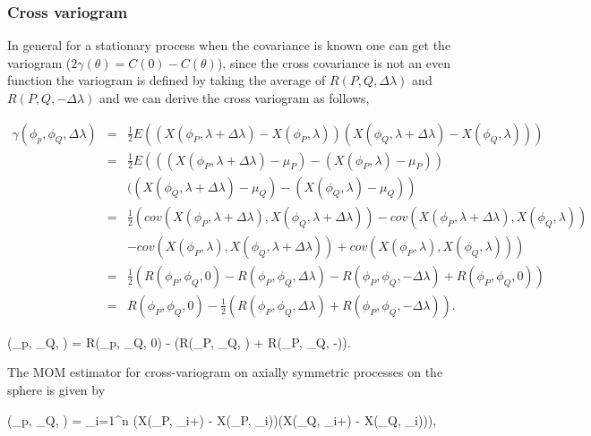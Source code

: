 			\subsubsection{Cross variogram}
					
			In general for a stationary process when the covariance is known one can get the variogram ($2\gamma (\theta) = C(0) - C(\theta)$), since the cross covariance is not an even function the variogram is defined by taking the average of $R(P,Q, \Delta\lambda)$ and $R(P,Q,-\Delta\lambda)$ and we can derive the cross variogram as follows, 
					
				
			\begin{eqnarray*}
				\gamma(\phi_p, \phi_Q, \Delta\lambda) &=& \frac{1}{2}E\left((X(\phi_P, \lambda+\Delta \lambda) - X(\phi_P, \lambda))(X(\phi_Q, \lambda+\Delta \lambda) - X(\phi_Q, \lambda))\right) \\
				&=& \frac{1}{2} E\left(((X(\phi_P, \lambda+\Delta \lambda) - \mu_P) - (X(\phi_P, \lambda)- \mu_P)) \right. \\
				& & \left.((X(\phi_Q, \lambda+\Delta \lambda) - \mu_Q) - (X(\phi_Q, \lambda) - \mu_Q)\right) \\
				&=& \frac{1}{2} \left(cov(X(\phi_P, \lambda+\Delta \lambda), X(\phi_Q, \lambda+\Delta \lambda)) - cov(X(\phi_P, \lambda+\Delta \lambda), X(\phi_Q, \lambda)) \right. \\
				& & \left. - cov(X(\phi_P, \lambda), X(\phi_Q, \lambda + \Delta \lambda)) + cov(X(\phi_P, \lambda), X(\phi_Q, \lambda))  \right) \\
				&=& \frac{1}{2} \left(R(\phi_P, \phi_Q, 0) - R(\phi_P, \phi_Q, \Delta \lambda) - R(\phi_P, \phi_Q, -\Delta \lambda) + R(\phi_P, \phi_Q, 0)  \right) \\
				&=& R(\phi_P, \phi_Q, 0) - \frac{1}{2}(R(\phi_P, \phi_Q, \Delta \lambda) + R(\phi_P, \phi_Q, -\Delta \lambda)).
			\end{eqnarray*}
				
			\beq 
			\gamma(\phi_p, \phi_Q, \Delta\lambda) =  R(\phi_p, \phi_Q, 0) - (R(\phi_P, \phi_Q, \Delta \lambda) + R(\phi_P, \phi_Q, -\Delta \lambda)).
			\eeq 
				
			The MOM estimator for cross-variogram on axially symmetric processes on the sphere is given by
				
			\beq \label{cross_variogram}
			\hat{\gamma}(\phi_p, \phi_Q, \Delta\lambda) =  \sum_{i=1}^n \left(X(\phi_P, \lambda_i+\Delta \lambda) - X(\phi_P, \lambda_i))(X(\phi_Q, \lambda_i+\Delta \lambda) - X(\phi_Q, \lambda_i))\right),
			\eeq
				
